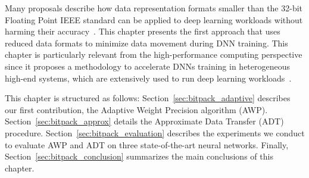 Many proposals describe how data representation formats smaller than the 32-bit Floating Point IEEE standard can be applied to deep learning workloads without harming their accuracy~\cite{bottou08, gupta15, Micikevicius2018}.
This chapter presents the first approach that uses reduced data formats to minimize data movement during DNN training.
This chapter is particularly relevant from the high-performance computing perspective since it proposes
a methodology to accelerate DNNs training in heterogeneous high-end systems, which are extensively used to run deep learning workloads~\cite{You17}. 

This chapter is structured as follows:
Section~\ref{sec:bitpack_adaptive} describes our first contribution, the Adaptive Weight 
Precision algorithm (AWP). 
Section~\ref{sec:bitpack_approx} details the Approximate Data Transfer (ADT) procedure. 
Section~\ref{sec:bitpack_evaluation} describes the  
experiments we conduct to evaluate AWP and ADT on three state-of-the-art neural networks. 
Finally, Section~\ref{sec:bitpack_conclusion} summarizes the main conclusions of this chapter.
